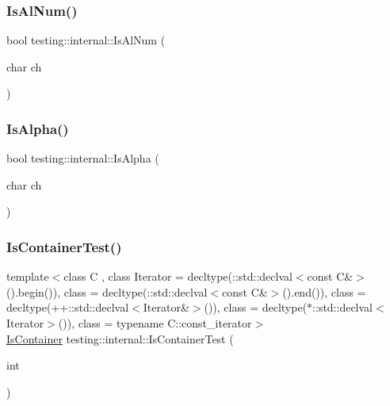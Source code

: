 \mbox{\label{namespacetesting_1_1internal_a83802e7f23324cd512232203662e1a98}} 
\subsubsection{\texorpdfstring{IsAlNum()}{IsAlNum()}}
{\footnotesize\ttfamily bool testing\+::internal\+::\+Is\+Al\+Num (\begin{DoxyParamCaption}\item[{char}]{ch }\end{DoxyParamCaption})\hspace{0.3cm}{\ttfamily [inline]}}

\mbox{\label{namespacetesting_1_1internal_aeb957087fd6bbf9db98ab7cd41b0c129}} 
\subsubsection{\texorpdfstring{IsAlpha()}{IsAlpha()}}
{\footnotesize\ttfamily bool testing\+::internal\+::\+Is\+Alpha (\begin{DoxyParamCaption}\item[{char}]{ch }\end{DoxyParamCaption})\hspace{0.3cm}{\ttfamily [inline]}}

\mbox{\label{namespacetesting_1_1internal_a764748b94f628bdd1dcd39dc81e8b71f}} 
\subsubsection{\texorpdfstring{IsContainerTest()}{IsContainerTest()}\hspace{0.1cm}{\footnotesize\ttfamily [1/3]}}
{\footnotesize\ttfamily template$<$class C , class Iterator  = decltype(\+::std\+::declval$<$const C\&$>$().\+begin()), class  = decltype(\+::std\+::declval$<$const C\&$>$().\+end()), class  = decltype(++\+::std\+::declval$<$\+Iterator\&$>$()), class  = decltype($\ast$\+::std\+::declval$<$\+Iterator$>$()), class  = typename C\+::const\+\_\+iterator$>$ \\
\mbox{\hyperlink{namespacetesting_1_1internal_ad8f0c2883245f1df2a53618a49f0deb3}{Is\+Container}} testing\+::internal\+::\+Is\+Container\+Test (\begin{DoxyParamCaption}\item[{int}]{ }\end{DoxyParamCaption})}

